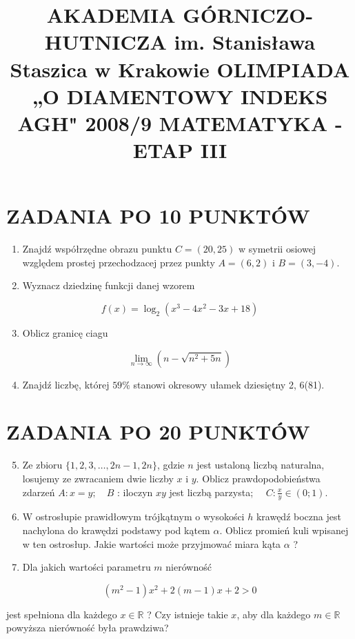 \documentclass[10pt]{article}
\title{AKADEMIA GÓRNICZO-HUTNICZA im. Stanisława Staszica w Krakowie OLIMPIADA „O DIAMENTOWY INDEKS AGH" 2008/9 MATEMATYKA - ETAP III }
\author{}
\date{}
\begin{document}
\maketitle
\section*{ZADANIA PO 10 PUNKTÓW}
\begin{enumerate}
  \item Znajdź współrzędne obrazu punktu $C=(20,25)$ w symetrii osiowej względem prostej przechodzacej przez punkty $A=(6,2)$ i $B=(3,-4)$.
  \item Wyznacz dziedzinę funkcji danej wzorem
\end{enumerate}

$$
f(x)=\log _{2}\left(x^{3}-4 x^{2}-3 x+18\right)
$$

\begin{enumerate}
  \setcounter{enumi}{2}
  \item Oblicz granicę ciagu
\end{enumerate}

$$
\lim _{n \rightarrow \infty}\left(n-\sqrt{n^{2}+5 n}\right)
$$

\begin{enumerate}
  \setcounter{enumi}{3}
  \item Znajdź liczbę, której $59 \%$ stanowi okresowy ułamek dziesiętny 2, 6(81).
\end{enumerate}

\section*{ZADANIA PO 20 PUNKTÓW}
\begin{enumerate}
  \setcounter{enumi}{4}
  \item Ze zbioru $\{1,2,3, \ldots, 2 n-1,2 n\}$, gdzie $n$ jest ustaloną liczbą naturalna, losujemy ze zwracaniem dwie liczby $x$ i $y$. Oblicz prawdopodobieństwa zdarzeń $A: x=y ; \quad B$ : iloczyn $x y$ jest liczbą parzysta; $\quad C: \frac{x}{y} \in(0 ; 1)$.
  \item W ostrosłupie prawidłowym trójkątnym o wysokości $h$ krawędź boczna jest nachylona do krawędzi podstawy pod kątem $\alpha$. Oblicz promień kuli wpisanej w ten ostrosłup. Jakie wartości może przyjmować miara kąta $\alpha$ ?
  \item Dla jakich wartości parametru $m$ nierówność
\end{enumerate}

$$
\left(m^{2}-1\right) x^{2}+2(m-1) x+2>0
$$

jest spełniona dla każdego $x \in \mathbb{R}$ ? Czy istnieje takie $x$, aby dla każdego $m \in \mathbb{R}$ powyższa nierówność była prawdziwa?
\end{document}
